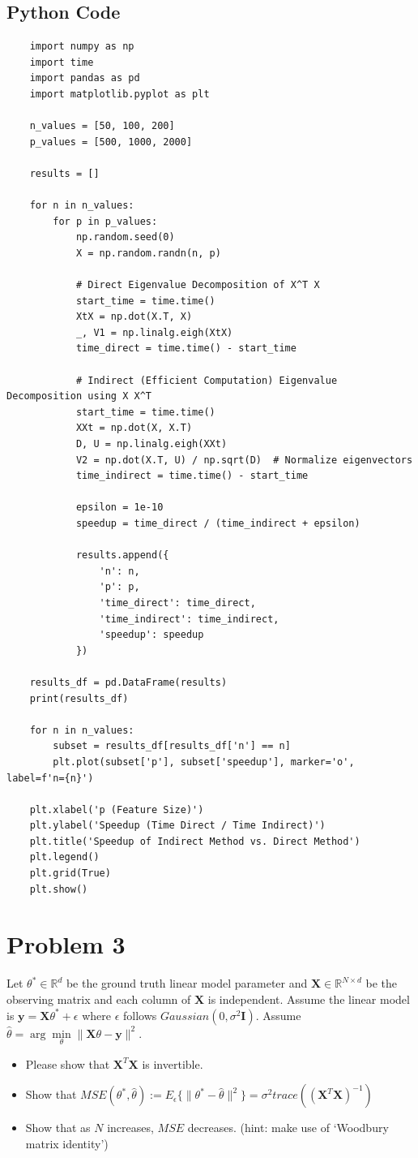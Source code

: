 \documentclass[11pt]{article}
\newcommand{\R}{\mathbb{R}}
\newcommand{\mtx}[1]{\mathbf{#1}}
\newcommand{\vct}[1]{\mathbf{#1}}
\def \mI {\mtx{I}}
\def \mX {\mtx{X}}
\def \vy {\vct{y}}
\def \R {\mathbb{R}}
\begin{document}
	\subsection*{Python Code}
	
	\begin{verbatim}
	import numpy as np
	import time
	import pandas as pd
	import matplotlib.pyplot as plt

	n_values = [50, 100, 200]
	p_values = [500, 1000, 2000]

	results = []

	for n in n_values:
		for p in p_values:
			np.random.seed(0)
			X = np.random.randn(n, p)

			# Direct Eigenvalue Decomposition of X^T X
			start_time = time.time()
			XtX = np.dot(X.T, X)
			_, V1 = np.linalg.eigh(XtX)
			time_direct = time.time() - start_time

			# Indirect (Efficient Computation) Eigenvalue Decomposition using X X^T
			start_time = time.time()
			XXt = np.dot(X, X.T)
			D, U = np.linalg.eigh(XXt)
			V2 = np.dot(X.T, U) / np.sqrt(D)  # Normalize eigenvectors
			time_indirect = time.time() - start_time

			epsilon = 1e-10
			speedup = time_direct / (time_indirect + epsilon)

			results.append({
				'n': n,
				'p': p,
				'time_direct': time_direct,
				'time_indirect': time_indirect,
				'speedup': speedup
			})

	results_df = pd.DataFrame(results)
	print(results_df)

	for n in n_values:
		subset = results_df[results_df['n'] == n]
		plt.plot(subset['p'], subset['speedup'], marker='o', label=f'n={n}')

	plt.xlabel('p (Feature Size)')
	plt.ylabel('Speedup (Time Direct / Time Indirect)')
	plt.title('Speedup of Indirect Method vs. Direct Method')
	plt.legend()
	plt.grid(True)
	plt.show()

	\end{verbatim}
	\newpage

	
	\section*{Problem 3}
	Let $\theta^*\in\R^d$ be the ground truth linear model parameter and $\mX\in\R^{N\times d}$ be the observing matrix and each column of $\mX$ is independent. Assume the linear model is $\vy=\mX\theta^*+\epsilon$ where $\epsilon$ follows $Gaussian(0,\sigma^2\mI)$. Assume $\hat{\theta}=\arg\min\limits_\theta \|\mX\theta-\vy\|^2$.
	\begin{itemize}
		\item Please show that $\mX^T\mX$ is invertible.
		\item Show that $MSE(\theta^*,\hat{\theta}):=E_\epsilon \{\|\theta^*-\hat{\theta}\|^2\}=\sigma^2 trace((\mX^T\mX)^{-1})$
		\item Show that as $N$ increases, $MSE$ decreases. (hint: make use of `Woodbury matrix identity')
	\end{itemize} 
\end{document}
